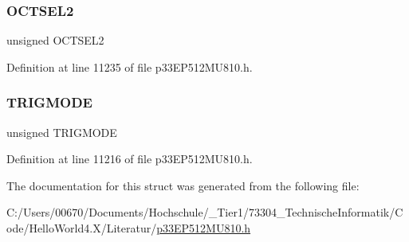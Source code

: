 \subsubsection{\texorpdfstring{O\+C\+T\+S\+E\+L2}{OCTSEL2}}
{\footnotesize\ttfamily unsigned O\+C\+T\+S\+E\+L2}



Definition at line 11235 of file p33\+E\+P512\+M\+U810.\+h.

\mbox{\label{structtag_o_c3_c_o_n1_b_i_t_s_a7a0057e0dca6e2663584b5b9e1da04c3}} 
\subsubsection{\texorpdfstring{T\+R\+I\+G\+M\+O\+DE}{TRIGMODE}}
{\footnotesize\ttfamily unsigned T\+R\+I\+G\+M\+O\+DE}



Definition at line 11216 of file p33\+E\+P512\+M\+U810.\+h.



The documentation for this struct was generated from the following file\+:\begin{DoxyCompactItemize}
\item 
C\+:/\+Users/00670/\+Documents/\+Hochschule/\+\_\+\+Tier1/73304\+\_\+\+Technische\+Informatik/\+Code/\+Hello\+World4.\+X/\+Literatur/\hyperlink{p33_e_p512_m_u810_8h}{p33\+E\+P512\+M\+U810.\+h}\end{DoxyCompactItemize}
